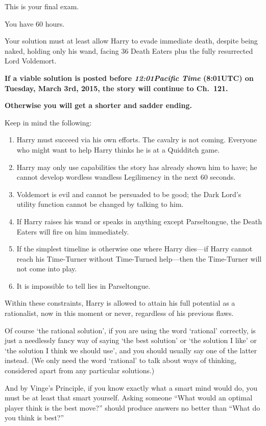 {\setlength{\parindent}{0pt}
\setlength{\parskip}{.5\baselineskip}

This is your final exam.

You have 60 hours.

Your solution must at least allow Harry to evade immediate death,
despite being naked, holding only his wand, facing 36 Death Eaters
plus the fully resurrected Lord Voldemort.

\textbf{If a viable solution is posted before \emph{12:01\am Pacific Time} (8:01\am UTC) on Tuesday, March 3rd, 2015, the story will continue to Ch.~121.}

\textbf{Otherwise you will get a shorter and sadder ending.}

Keep in mind the following:
\begin{enumerate}
\item Harry must succeed via his own efforts. The cavalry is not coming.
Everyone who might want to help Harry thinks he is at a Quidditch game.
\item Harry may only use capabilities the story has already shown him to
have; he cannot develop wordless wandless Legilimency in the next 60 seconds.
\item Voldemort is evil and cannot be persuaded to be good; the Dark Lord’s utility function cannot be changed by talking to him.
\item If Harry raises his wand or speaks in anything except Parseltongue, the Death Eaters will fire on him immediately.
\item If the simplest timeline is otherwise one where Harry dies—if Harry cannot reach his Time-Turner without Time-Turned help—then the Time-Turner will not come into play.
\item It is impossible to tell lies in Parseltongue.
\end{enumerate}
{\setlength{\parindent}{0pt}
\setlength{\parskip}{.5\baselineskip}
Within these constraints, Harry is allowed to attain his full potential as a rationalist, now in this moment or never, regardless of his previous flaws.

Of course ‘the rational solution’, if you are using the word ‘rational’ correctly, is just a needlessly fancy way of saying ‘the best solution’ or ‘the solution I like’ or ‘the solution I think we should use’, and you should usually say one of the latter instead. (We only need the word ‘rational’ to talk about ways of thinking, considered apart from any particular solutions.)

And by Vinge’s Principle, if you know exactly what a smart mind would do, you must be at least that smart yourself. Asking someone “What would an optimal player think is the best move?” should produce answers no better than “What do you think is best?”

}}

